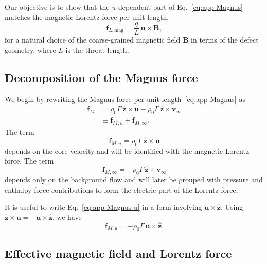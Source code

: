 \documentclass[11pt]{article}
\begin{document}
Our objective is to show that the $u$-dependent part of Eq.~\eqref{eq:app-Magnus} matches the magnetic Lorentz force per unit length,
\begin{equation}
\mathbf{f}_{L,\mathrm{mag}}
= \frac{q}{L}\,\mathbf{u}\times\mathbf{B},
\end{equation}
for a natural choice of the coarse-grained magnetic field $\mathbf{B}$ in terms of the defect geometry, where $L$ is the throat length.

\subsection{Decomposition of the Magnus force}

We begin by rewriting the Magnus force per unit length~\eqref{eq:app-Magnus} as
\begin{align}
\mathbf{f}_M
&= \rho_0 \Gamma\,\hat{\mathbf{z}} \times \mathbf{u}
   - \rho_0 \Gamma\,\hat{\mathbf{z}} \times \mathbf{v}_\infty
\nonumber\\
&\equiv \mathbf{f}_{M,u} + \mathbf{f}_{M,\infty}.
\label{eq:app-Magnus-decomposition}
\end{align}
The term
\begin{equation}
\mathbf{f}_{M,u} = \rho_0 \Gamma\,\hat{\mathbf{z}} \times \mathbf{u}
\label{eq:app-Magnus-u}
\end{equation}
depends on the core velocity and will be identified with the magnetic Lorentz force.  The term
\begin{equation}
\mathbf{f}_{M,\infty} = -\rho_0 \Gamma\,\hat{\mathbf{z}} \times \mathbf{v}_\infty
\label{eq:app-Magnus-background}
\end{equation}
depends only on the background flow and will later be grouped with pressure and enthalpy-force contributions to form the electric part of the Lorentz force.

It is useful to write Eq.~\eqref{eq:app-Magnus-u} in a form involving $\mathbf{u}\times\hat{\mathbf{z}}$.  Using $\hat{\mathbf{z}} \times \mathbf{u} = -\mathbf{u}\times\hat{\mathbf{z}}$, we have
\begin{equation}
\mathbf{f}_{M,u}
= -\rho_0 \Gamma\,\mathbf{u}\times\hat{\mathbf{z}}.
\label{eq:app-Magnus-u-cross}
\end{equation}

\subsection{Effective magnetic field and Lorentz force}
\end{document}
